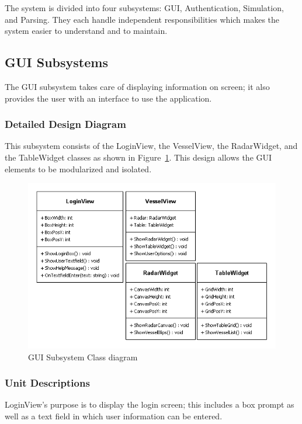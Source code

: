 \documentclass[12pt]{article}
\begin{document}
The system is divided into four subsystems: GUI, Authentication, Simulation, and Parsing. They each handle independent responsibilities which makes the system easier to understand and to maintain.


\subsection{GUI Subsystems}
The GUI subsystem takes care of displaying information on screen; it also provides the user with an interface to use the application.


\subsubsection{Detailed Design Diagram}
This subsystem consists of the LoginView, the VesselView, the RadarWidget, and the TableWidget classes as shown in Figure~\ref{fig:GUISubsystemClassDiagram}. This design allows the GUI elements to be modularized and isolated.
\begin{figure}[h!]
    \centering
    \includegraphics[scale=0.8]{3_1_1_guisubsystem}
    \caption{GUI Subsystem Class diagram}
    \label{fig:GUISubsystemClassDiagram}
\end{figure}


\subsubsection{Unit Descriptions}
\vspace*{0.2in}
\vspace*{0.15in}
LoginView’s purpose is to display the login screen; this includes a box prompt as well as a text field in which user information can be entered.
\end{document}
